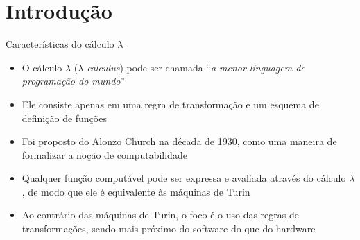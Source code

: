 \section{Introdução}

\begin{frame}[fragile]{Características do cálculo $\lambda$}

    \begin{itemize}
        \item O cálculo $\lambda$ ($\lambda$ \textit{calculus}) pode ser chamada ``\textit{a menor 
            linguagem de programação do mundo}''

        \item Ele consiste apenas em uma regra de transformação e um esquema de definição de 
            funções

        \item Foi proposto do Alonzo Church na década de 1930, como uma maneira de formalizar a
            noção de computabilidade

        \item Qualquer função computável pode ser expressa e avaliada através do cálculo $\lambda$,
            de modo que ele é equivalente às máquinas de Turin
            
        \item Ao contrário das máquinas de Turin, o foco é o uso das regras de transformações, 
            sendo mais próximo do software do que do hardware
    \end{itemize}

\end{frame}
